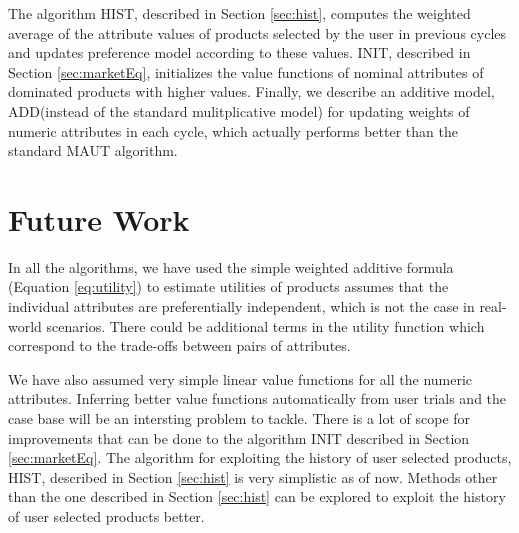 The algorithm HIST, described in Section \ref{sec:hist}, computes the weighted average of the attribute values of products selected by the user in previous cycles and updates preference model according to these values.
INIT, described in Section \ref{sec:marketEq}, initializes the value functions of  nominal attributes of dominated products with higher values.
Finally, we describe an additive model, ADD(instead of the standard mulitplicative model) for updating weights of numeric attributes in each cycle, which actually performs better than the standard MAUT algorithm.


\section{Future Work}
In all the algorithms, we have used the simple weighted additive formula  (Equation \ref{eq:utility}) to estimate utilities of products assumes that the individual attributes are preferentially independent, which is not the case in real-world scenarios.
There could be additional terms in the utility function which correspond to the trade-offs between pairs of attributes.

We have also assumed very simple linear value functions for all the numeric attributes. 
Inferring better value functions automatically from user trials and the case base will be an intersting problem to tackle.
There is a lot of scope for improvements that can be done to the algorithm INIT described in Section \ref{sec:marketEq}.
The algorithm for exploiting the history of user selected products, HIST, described in Section \ref{sec:hist} is very simplistic as of now. 
Methods other than the one described in Section \ref{sec:hist} can be explored to exploit the history of user selected products better.
